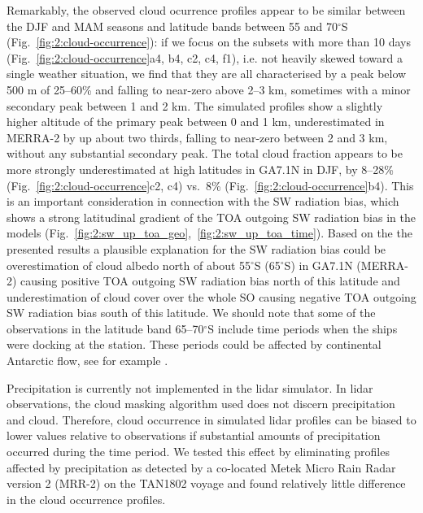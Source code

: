 Remarkably, the observed cloud ocurrence profiles appear
to be similar between the DJF and MAM seasons and
latitude bands between 55 and 70$^\circ$S (Fig.~\ref{fig:2:cloud-occurrence}):
if we focus on the subsets with more than 10 days (Fig.~\ref{fig:2:cloud-occurrence}a4, b4, c2, c4, f1),
i.e. not heavily skewed toward a single weather situation,
we find that they are
all characterised by a peak below 500 m of 25--60\% and falling to near-zero
above 2--3 km, sometimes with a minor secondary peak between 1 and 2 km.
The simulated profiles show a slightly higher altitude of the primary peak
between 0 and 1 km, underestimated in MERRA-2 by up about two thirds,
falling to near-zero between 2 and 3 km, without any substantial secondary peak.
The total cloud fraction appears to be more strongly underestimated at high
latitudes in GA7.1N in DJF, by 8--28\% (Fig.~\ref{fig:2:cloud-occurrence}c2, c4)
vs.~8\% (Fig.~\ref{fig:2:cloud-occurrence}b4).
This is an important consideration in connection with the SW radiation bias, which shows a strong
latitudinal gradient of the TOA outgoing SW radiation bias in the models
(Fig.~\ref{fig:2:sw_up_toa_geo},~\ref{fig:2:sw_up_toa_time}). Based on the the
presented results a plausible explanation for the SW radiation bias could be
overestimation of cloud albedo north of about 55$^\circ$S (65$^\circ$S) in
GA7.1N (MERRA-2) causing positive TOA outgoing SW radiation bias north of this
latitude and underestimation of cloud cover over the whole SO causing negative
TOA outgoing SW radiation bias south of this latitude.
We should note that some of the observations in the latitude band 65--70$^\circ$S
include time periods when the ships were docking at the station. These periods
could be affected by continental Antarctic flow, see for example \cite{jolly2018}.

Precipitation is currently not implemented in the lidar simulator. In lidar
observations, the cloud masking algorithm used does not discern precipitation
and cloud. Therefore, cloud occurrence in simulated lidar profiles can be biased
to lower values relative to observations if substantial amounts of precipitation
occurred during the time period. We tested this effect by eliminating profiles
affected by precipitation as detected by a co-located
Metek Micro Rain Radar version 2 (MRR-2) on the TAN1802 voyage and found
relatively little difference in the cloud occurrence profiles.


